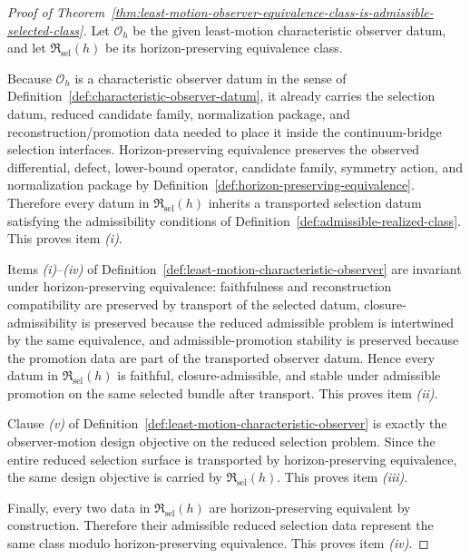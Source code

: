 \begin{proof}[Proof of Theorem~\ref{thm:least-motion-observer-equivalence-class-is-admissible-selected-class}]
\label{proof:thm:least-motion-observer-equivalence-class-is-admissible-selected-class}
Let \(\mathcal O_h\) be the given least-motion characteristic observer datum,
and let \(\mathfrak R_{\mathrm{sel}}(h)\) be its horizon-preserving
equivalence class.

Because \(\mathcal O_h\) is a characteristic observer datum in the sense of
Definition~\ref{def:characteristic-observer-datum}, it already carries the
selection datum, reduced candidate family, normalization package, and
reconstruction/promotion data needed to place it inside the continuum-bridge
selection interfaces. Horizon-preserving equivalence preserves the observed
differential, defect, lower-bound operator, candidate family, symmetry action,
and normalization package by
Definition~\ref{def:horizon-preserving-equivalence}. Therefore every datum in
\(\mathfrak R_{\mathrm{sel}}(h)\) inherits a transported selection datum
satisfying the admissibility conditions of
Definition~\ref{def:admissible-realized-class}. This proves item \emph{(i)}.

Items \emph{(i)}--\emph{(iv)} of
Definition~\ref{def:least-motion-characteristic-observer} are invariant under
horizon-preserving equivalence: faithfulness and reconstruction compatibility
are preserved by transport of the selected datum, closure-admissibility is
preserved because the reduced admissible problem is intertwined by the same
equivalence, and admissible-promotion stability is preserved because the
promotion data are part of the transported observer datum. Hence every datum in
\(\mathfrak R_{\mathrm{sel}}(h)\) is faithful, closure-admissible, and stable
under admissible promotion on the same selected bundle after transport. This
proves item \emph{(ii)}.

Clause \emph{(v)} of
Definition~\ref{def:least-motion-characteristic-observer} is exactly the
observer-motion design objective on the reduced selection problem. Since the
entire reduced selection surface is transported by horizon-preserving
equivalence, the same design objective is carried by
\(\mathfrak R_{\mathrm{sel}}(h)\). This proves item \emph{(iii)}.

Finally, every two data in \(\mathfrak R_{\mathrm{sel}}(h)\) are
horizon-preserving equivalent by construction. Therefore their admissible
reduced selection data represent the same class modulo
horizon-preserving equivalence. This proves item \emph{(iv)}.
\end{proof}

